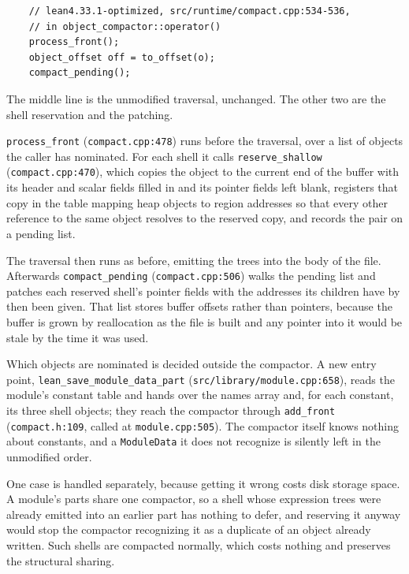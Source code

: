 \documentclass{article}
\begin{document}
\begin{small}
\begin{verbatim}
    // lean4.33.1-optimized, src/runtime/compact.cpp:534-536,
    // in object_compactor::operator()
    process_front();
    object_offset off = to_offset(o);
    compact_pending();
\end{verbatim}
\end{small}

\noindent The middle line is the unmodified traversal, unchanged. The other two are the shell reservation and the patching.

\texttt{process\_front} (\texttt{compact.cpp:478}) runs before the traversal, over a list of objects the caller has nominated. For each shell it calls \texttt{reserve\_shallow} (\texttt{compact.cpp:470}), which copies the object to the current end of the buffer with its header and scalar fields filled in and its pointer fields left blank, registers that copy in the table mapping heap objects to region addresses so that every other reference to the same object resolves to the reserved copy, and records the pair on a pending list.

The traversal then runs as before, emitting the trees into the body of the file. Afterwards \texttt{compact\_\allowbreak pending} (\texttt{compact.cpp:506}) walks the pending list and patches each reserved shell's pointer fields with the addresses its children have by then been given. That list stores buffer offsets rather than pointers, because the buffer is grown by reallocation as the file is built and any pointer into it would be stale by the time it was used.

Which objects are nominated is decided outside the compactor. A new entry point, \texttt{lean\_\allowbreak save\_\allowbreak module\_\allowbreak data\_\allowbreak part} (\texttt{src/library/module.cpp:658}), reads the module's constant table and hands over the names array and, for each constant, its three shell objects; they reach the compactor through \texttt{add\_front} (\texttt{compact.h:109}, called at \texttt{module.cpp:505}). The compactor itself knows nothing about constants, and a \texttt{ModuleData} it does not recognize is silently left in the unmodified order.

One case is handled separately, because getting it wrong costs disk storage space. A module's parts share one compactor, so a shell whose expression trees were already emitted into an earlier part has nothing to defer, and reserving it anyway would stop the compactor recognizing it as a duplicate of an object already written. Such shells are compacted normally, which costs nothing and preserves the structural sharing.
\end{document}
